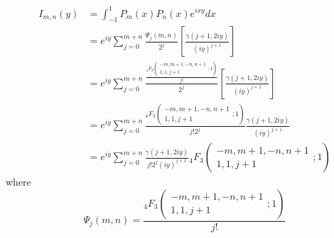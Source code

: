 \documentclass{article}
\begin{document}
\begin{theorem}
  \label{thm:MainResult}
  \begin{equation*}
    \begin{aligned}
      I_{m, n} (y) & = \int_{- 1}^1 P_m (x) P_n (x) e^{ixy} dx \\
      & = e^{iy}  \sum_{j = 0}^{m + n} \frac{\Psi_j (m, n)}{2^j} \left[
      \frac{\gamma (j + 1, 2 iy)}{(iy)^{j + 1}} \right] \\
      & = e^{iy}  \sum_{j = 0}^{m + n} \frac{\frac{{}_4 F_3
      \left( \begin{array}{c}
        - m, m + 1, - n, n + 1 \\
        1, 1, j + 1
      \end{array} ; 1 \right)}{j!}}{2^j} \left[ \frac{\gamma (j + 1, 2
      iy)}{(iy)^{j + 1}} \right] \\
      & = e^{iy}  \sum_{j = 0}^{m + n} \frac{{}_4 F_3 \left(
      \begin{array}{c}
        - m, m + 1, - n, n + 1 \\
        1, 1, j + 1
      \end{array} ; 1 \right)}{j! 2^j} \frac{\gamma (j + 1, 2 iy)}{(iy)^{j +
      1}} \\
      & = e^{iy}  \sum_{j = 0}^{m + n} \frac{\gamma (j + 1, 2 iy)}{j! 2^j
      (iy)^{j + 1}} {}_4 F_3 \left( \begin{array}{c}
        - m, m + 1, - n, n + 1 \\
        1, 1, j + 1
      \end{array} ; 1 \right)
    \end{aligned}
  \end{equation*}
  where
  \begin{equation*}
    \Psi_j (m, n) = \frac{{}_4 F_3 \left( \begin{array}{c}
      - m, m + 1, - n, n + 1 \\
      1, 1, j + 1
    \end{array} ; 1 \right)}{j!}
  \end{equation*}
\end{theorem}
\end{document}
